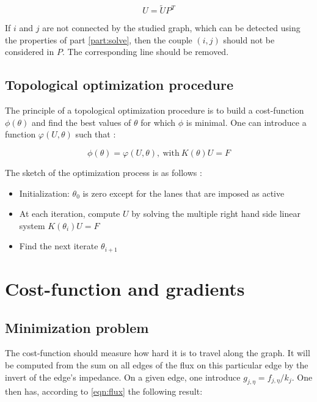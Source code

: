 \documentclass[11pt,a4paper]{article}		%
\begin{document}
\begin{equation}
U = \tilde{U} P^T
\end{equation}

If $i$ and $j$ are not connected by the studied graph, which can be detected using the properties of part \ref{part:solve}, then the couple $(i,j)$ should not be considered in $P$. The corresponding line should be removed.

\subsection{Topological optimization procedure}

The principle of a topological optimization procedure is to build a cost-function $\phi(\theta)$ and find the best values of $\theta$ for which $\phi$ is minimal. One can introduce a function $\varphi(U,\theta)$ such that :

\begin{equation}
\phi(\theta) = \varphi(U,\theta),\ \text{with}\ K(\theta)U = F
\end{equation}

The sketch of the optimization process is as follows :

\begin{itemize}
	\item Initialization: $\theta_0$ is zero except for the lanes that are imposed as active
	\item At each iteration, compute $U$ by solving the multiple right hand side linear system $K(\theta_i)U=F$
	\item Find the next iterate $\theta_{i+1}$
\end{itemize}


\section{Cost-function and gradients}

\subsection{Minimization problem}

The cost-function should measure how hard it is to travel along the graph. It will be computed from the sum on all edges of the flux on this particular edge by the invert of the edge's impedance. On a given edge, one introduce $g_{j,\eta} = f_{j,\eta}/k_j$. One then has, according to \eqref{eqn:flux} the following result:
\end{document}
